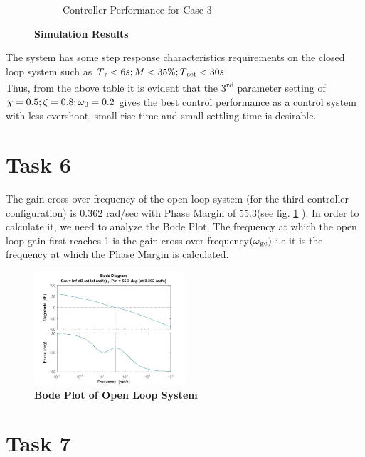 \documentclass[a4paper,12pt,oneside,onecolumn]{article} %
\begin{document}
\begin{figure}[H]
\begin{subfigure}{0.4\textwidth}
\caption{Controller Performance for Case 3}
\end{subfigure}
\caption{\textbf{Simulation Results}}
\end{figure} 

The system has some step response characteristics requirements on the closed loop system such as $T\textsubscript{r} < 6s ; M < 35\% ;  T\textsubscript{set} < 30s$ \\
Thus, from the above table it is evident that the 3\textsuperscript{rd} parameter setting of $\chi = 0.5; \zeta = 0.8; \omega \textsubscript{0} = 0.2$ gives the best control performance as a control system with less overshoot, small rise-time and small settling-time is desirable.


\section*{Task 6}

The gain cross over frequency of the open loop system (for the third controller configuration) is 0.362 rad/sec with Phase Margin of 55.3\degree(see fig. \ref{fig:Bode} ).
In order to calculate it, we need to analyze the Bode Plot. The frequency at which the open loop gain first reaches 1 is the gain cross over frequency$( \omega \textsubscript{gc})$ i.e it is the frequency at which the Phase Margin is calculated. 

\begin{figure}[H]
\centering
  \includegraphics[width = 0.5\textwidth]{ex_6}
\caption{\textbf{Bode Plot of Open Loop System}}
\label{fig:Bode}
 \end{figure}



\section*{Task 7}
\end{document}
